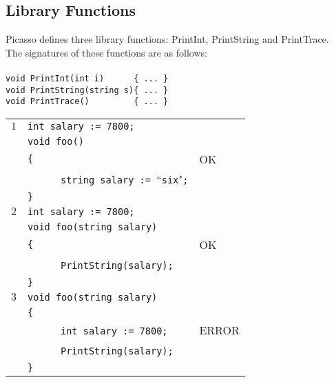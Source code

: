 \documentclass{article}
\begin{document}
\subsection{Library Functions}
\label{subsection_Library_Functions}
Picasso defines three library functions: PrintInt, PrintString and PrintTrace.\\
The signatures of these functions are as follows:\\ \\
\verb"void PrintInt(int i)      { ... }"\\ 
\verb"void PrintString(string s){ ... }"\\ 
\verb"void PrintTrace()         { ... }"\\ 
\newpage
\begin{table}[h]
\centering
\begin{tabular}{|l|l|l|}
\hline
 $1$ & \verb"int salary := 7800;"                            &    \\
     & \verb"void foo()"                                     &    \\
     & \verb"{"                                              & OK \\
     & ~ ~ ~ ~\verb"string salary := "``\verb"six""\verb";"  &    \\
     & \verb"}"                                              &    \\
\hline
 $2$ & \verb"int salary := 7800;"         &    \\
     & \verb"void foo(string salary)"     &    \\
     & \verb"{"                           & OK \\
     & ~ ~ ~ ~\verb"PrintString(salary);" &    \\
     & \verb"}"                           &    \\
\hline
 $3$ & \verb"void foo(string salary)"     &       \\
     & \verb"{"                           &       \\
     & ~ ~ ~ ~\verb"int salary := 7800;"  & ERROR \\
     & ~ ~ ~ ~\verb"PrintString(salary);" &       \\
     & \verb"}"                           &       \\

\end{tabular}
\end{table}
\end{document}
